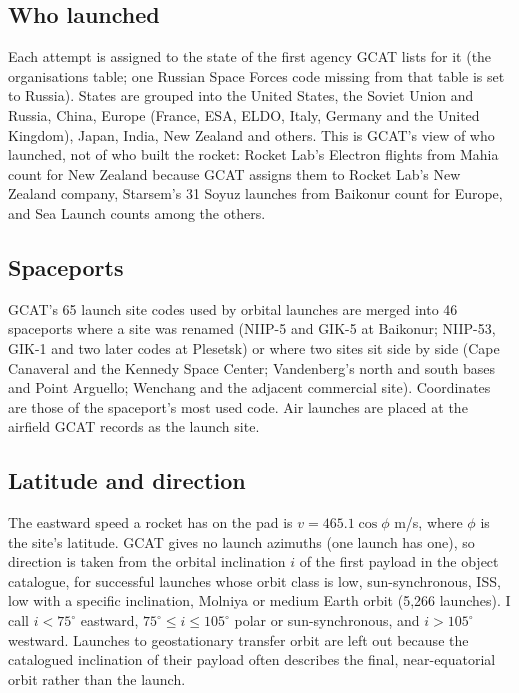 \documentclass[11pt,a4paper]{article}
\begin{document}
\subsection{Who launched}
Each attempt is assigned to the state of the first agency GCAT lists for it (the organisations table; one Russian Space Forces code missing from that table is set to Russia). States are grouped into the United States, the Soviet Union and Russia, China, Europe (France, ESA, ELDO, Italy, Germany and the United Kingdom), Japan, India, New Zealand and others. This is GCAT's view of who launched, not of who built the rocket: Rocket Lab's Electron flights from Mahia count for New Zealand because GCAT assigns them to Rocket Lab's New Zealand company, Starsem's 31 Soyuz launches from Baikonur count for Europe, and Sea Launch counts among the others.

\subsection{Spaceports}
GCAT's 65 launch site codes used by orbital launches are merged into 46 spaceports where a site was renamed (NIIP-5 and GIK-5 at Baikonur; NIIP-53, GIK-1 and two later codes at Plesetsk) or where two sites sit side by side (Cape Canaveral and the Kennedy Space Center; Vandenberg's north and south bases and Point Arguello; Wenchang and the adjacent commercial site). Coordinates are those of the spaceport's most used code. Air launches are placed at the airfield GCAT records as the launch site.

\subsection{Latitude and direction}
The eastward speed a rocket has on the pad is $v = 465.1\cos\phi$ m/s, where $\phi$ is the site's latitude. GCAT gives no launch azimuths (one launch has one), so direction is taken from the orbital inclination $i$ of the first payload in the object catalogue, for successful launches whose orbit class is low, sun-synchronous, ISS, low with a specific inclination, Molniya or medium Earth orbit (5,266 launches). I call $i < 75^\circ$ eastward, $75^\circ \le i \le 105^\circ$ polar or sun-synchronous, and $i > 105^\circ$ westward. Launches to geostationary transfer orbit are left out because the catalogued inclination of their payload often describes the final, near-equatorial orbit rather than the launch.
\end{document}
